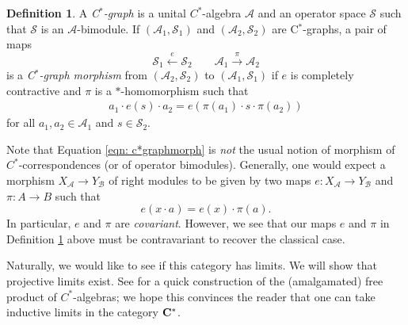 \documentclass[12pt]{article}
\theoremstyle{definition}
\newtheorem{definition}[theorem]{Definition}
\newenvironment{remark}
  {\pushQED{\qed}\renewcommand{\qedsymbol}{\textcircled{\tiny R}}\remarkx}
  {\popQED\endremarkx}
\newcommand{\mc}[1]{\mathcal{#1}}
\newcommand{\<}{\langle}
\renewcommand{\>}{\rangle}
\begin{document}
\begin{definition} \label{defn: c*graph}
    A \textit{C$^*$-graph} is a unital $C^*$-algebra $\mc A$ and an operator space $\mc S$ such that $\mc S$ is an $\mc A$-bimodule. If $(\mc A_1, \mc S_1)$ and $(\mc A_2, \mc S_2)$ are C$^*$-graphs, a pair of maps
    \[
    \mc S_1 \overset{e}{\longleftarrow} \mc S_2 \qquad \mc A_1 \overset{\pi}{\longrightarrow} \mc A_2
    \]
    is a \textit{C$^*$-graph morphism} from $(\mc A_2, \mc S_2)$ to $(\mc A_1, \mc S_1)$ if $e$ is completely contractive and $\pi$ is a $*$-homomorphism such that
    \begin{align} \label{eqn: c*graphmorph}
    a_1 \cdot e(s) \cdot a_2 = e(\pi(a_1) \cdot s \cdot \pi(a_2))
    \end{align}
    for all $a_1,a_2 \in \mc A_1$ and $s \in \mc S_2$.
\end{definition}

\begin{remark}
    Note that Equation \ref{eqn: c*graphmorph} is \textit{not} the usual notion of morphism of $C^*$-correspondences (or of operator bimodules). Generally, one would expect a morphism $X_{\mc A} \to Y_{\mc B}$ of right modules to be given by two maps $e:X_{\mc A} \to  Y_{\mc B}$ and $\pi: A \to B$ such that 
    \[
    e(x \cdot a) = e(x) \cdot \pi(a).
    \]
    In particular, $e$ and $\pi$ are \textit{covariant}. However, we see that our maps $e$ and $\pi$ in Definition \ref{defn: c*graph} above must be contravariant to recover the classical case. 
\end{remark}
    
Naturally, we would like to see if this category has limits. We will show that projective limits exist. See \cite[Chapter 2.6]{tensor-products-pisier} for a quick construction of the (amalgamated) free product of $C^*$-algebras; we hope this convinces the reader that one can take inductive limits in the category ${\bf C^*}$.
    
\end{document}
